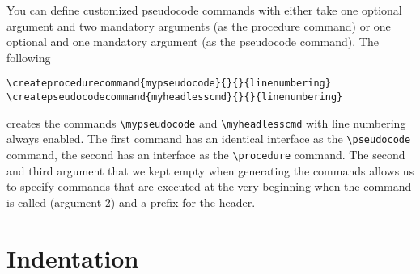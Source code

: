 \documentclass[a4paper]{report}
\begin{document}
You can define customized pseudocode commands with either take one optional argument and two mandatory arguments (as the procedure command)
or one optional and one mandatory argument (as the pseudocode command). The following
\begin{lstlisting}
\createprocedurecommand{mypseudocode}{}{}{linenumbering}
\createpseudocodecommand{myheadlesscmd}{}{}{linenumbering}
\end{lstlisting}
creates the commands \lstinline$\mypseudocode$ and \lstinline$\myheadlesscmd$ with line numbering always enabled. The first command
has an identical interface as the \lstinline$\pseudocode$ command, the second has an interface as the \lstinline$\procedure$ command.
The second and third argument that we kept empty when generating the commands allows us to specify commands that are executed at the
very beginning when the command is called (argument 2) and a prefix for the header.


\section{Indentation}
\end{document}
